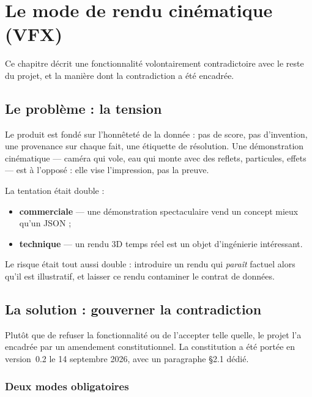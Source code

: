 \chapter{Le mode de rendu cinématique (VFX)}
\label{ch:vfx}

Ce chapitre décrit une fonctionnalité volontairement contradictoire avec le
reste du projet, et la manière dont la contradiction a été encadrée.

\section{Le problème : la tension}

Le produit est fondé sur l'honnêteté de la donnée : pas de score, pas
d'invention, une provenance sur chaque fait, une étiquette de résolution. Une
démonstration cinématique — caméra qui vole, eau qui monte avec des reflets,
particules, effets — est à l'opposé : elle vise l'impression, pas la preuve.

La tentation était double :

\begin{itemize}[leftmargin=1.4em]
  \item \textbf{commerciale} — une démonstration spectaculaire vend un concept
        mieux qu'un JSON ;
  \item \textbf{technique} — un rendu 3D temps réel est un objet d'ingénierie
        intéressant.
\end{itemize}

Le risque était tout aussi double : introduire un rendu qui \emph{paraît}
factuel alors qu'il est illustratif, et laisser ce rendu contaminer le contrat
de données.

\section{La solution : gouverner la contradiction}

Plutôt que de refuser la fonctionnalité ou de l'accepter telle quelle, le
projet l'a encadrée par un amendement constitutionnel. La constitution a été
portée en version~0.2 le 14 septembre 2026, avec un paragraphe §2.1 dédié.

\subsection{Deux modes obligatoires}


